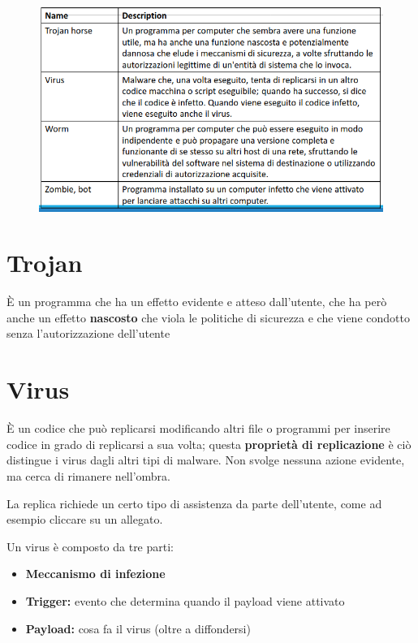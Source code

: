 \begin{figure}[H]
    \centering
    \includegraphics[width=1\linewidth]{chapters/5/images/classification3.png}
\end{figure}

\section{Trojan}
È un programma che ha un effetto evidente e atteso dall'utente, che ha però anche un 
effetto \textbf{nascosto} che viola le politiche di sicurezza e che viene condotto senza l'autorizzazione 
dell'utente

\section{Virus}
È un codice che può replicarsi modificando altri file o programmi per inserire codice in 
grado di replicarsi a sua volta; questa \textbf{proprietà di replicazione} è ciò distingue 
i virus dagli altri tipi di malware. Non svolge nessuna azione evidente, ma cerca di rimanere 
nell'ombra.

\noindent La replica richiede un certo tipo di assistenza da parte dell'utente, come ad esempio
cliccare su un allegato.

\noindent Un virus è composto da tre parti:
\begin{itemize}
    \item \textbf{Meccanismo di infezione}
    \item \textbf{Trigger:} evento che determina quando il payload viene attivato
    \item \textbf{Payload:} cosa fa il virus (oltre a diffondersi)
\end{itemize}

